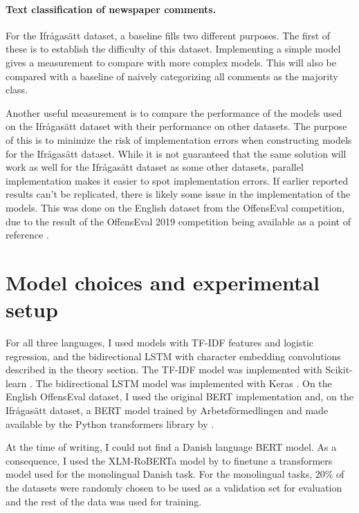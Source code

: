 \documentclass[nofilelist]{cslthse-msc}
\begin{document}
\paragraph{Text classification of newspaper comments.}
For the Ifrågasätt dataset, a baseline fills two different purposes. The first of these is to establish the difficulty of this dataset. Implementing a simple model gives a measurement to compare with more complex models. This will also be compared with a baseline of naively categorizing all comments as the majority class.

Another useful measurement is to compare the performance of the models used on the Ifrågasätt dataset with their performance on other datasets. The purpose of this is to minimize the risk of implementation errors when constructing models for the Ifrågasätt dataset. While it is not guaranteed that the same solution will work as well for the Ifrågasätt dataset as some other datasets, parallel implementation makes it easier to spot implementation errors. If earlier reported results can't be replicated, there is likely some issue in the implementation of the models. This was done on the English dataset from the OffensEval competition, due to the result of the OffensEval 2019 competition being available as a point of reference \citep{zampieri2019semeval}.

\section{Model choices and experimental setup}

For all three languages, I used  models with TF-IDF features and logistic regression, and the bidirectional LSTM with character embedding convolutions described in the theory section. The TF-IDF model was implemented with Scikit-learn \citep{scikit-learn}. The bidirectional LSTM model was implemented with Keras \citep{chollet2015keras}. On the English OffensEval dataset, I used the original BERT implementation and, on the Ifrågasätt dataset, a BERT model trained by Arbetsförmedlingen and made available by the Python transformers library  by \citet{Wolf2019HuggingFacesTS}. 

At the time of writing, I could not find a Danish language BERT model. As a consequence, I used the XLM-RoBERTa model by \citet{conneau2019unsupervised} to finetune a transformers model used for the monolingual Danish task. For the monolingual tasks, 20\% of the datasets were randomly chosen to be used as a validation set for evaluation and the rest of the data was used for training.
\end{document}

